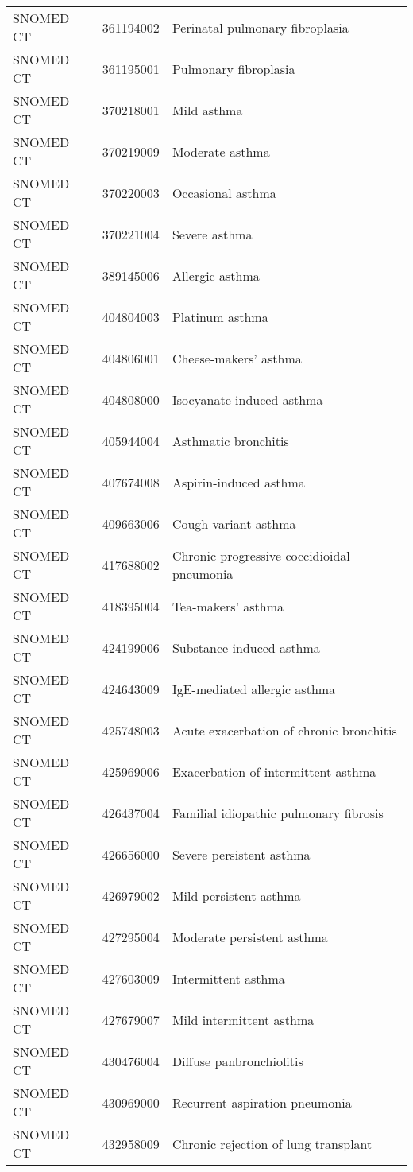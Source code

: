 \begin{table}[ht]
\begin{tabular}{lll}
  SNOMED CT & 361194002 & Perinatal pulmonary fibroplasia \\ 
  SNOMED CT & 361195001 & Pulmonary fibroplasia \\ 
  SNOMED CT & 370218001 & Mild asthma \\ 
  SNOMED CT & 370219009 & Moderate asthma \\ 
  SNOMED CT & 370220003 & Occasional asthma \\ 
  SNOMED CT & 370221004 & Severe asthma \\ 
  SNOMED CT & 389145006 & Allergic asthma \\ 
  SNOMED CT & 404804003 & Platinum asthma \\ 
  SNOMED CT & 404806001 & Cheese-makers' asthma \\ 
  SNOMED CT & 404808000 & Isocyanate induced asthma \\ 
  SNOMED CT & 405944004 & Asthmatic bronchitis \\ 
  SNOMED CT & 407674008 & Aspirin-induced asthma \\ 
  SNOMED CT & 409663006 & Cough variant asthma \\ 
  SNOMED CT & 417688002 & Chronic progressive coccidioidal pneumonia \\ 
  SNOMED CT & 418395004 & Tea-makers' asthma \\ 
  SNOMED CT & 424199006 & Substance induced asthma \\ 
  SNOMED CT & 424643009 & IgE-mediated allergic asthma \\ 
  SNOMED CT & 425748003 & Acute exacerbation of chronic bronchitis \\ 
  SNOMED CT & 425969006 & Exacerbation of intermittent asthma \\ 
  SNOMED CT & 426437004 & Familial idiopathic pulmonary fibrosis \\ 
  SNOMED CT & 426656000 & Severe persistent asthma \\ 
  SNOMED CT & 426979002 & Mild persistent asthma \\ 
  SNOMED CT & 427295004 & Moderate persistent asthma \\ 
  SNOMED CT & 427603009 & Intermittent asthma \\ 
  SNOMED CT & 427679007 & Mild intermittent asthma \\ 
  SNOMED CT & 430476004 & Diffuse panbronchiolitis \\ 
  SNOMED CT & 430969000 & Recurrent aspiration pneumonia \\ 
  SNOMED CT & 432958009 & Chronic rejection of lung transplant \\ 

\end{tabular}
\end{table}
